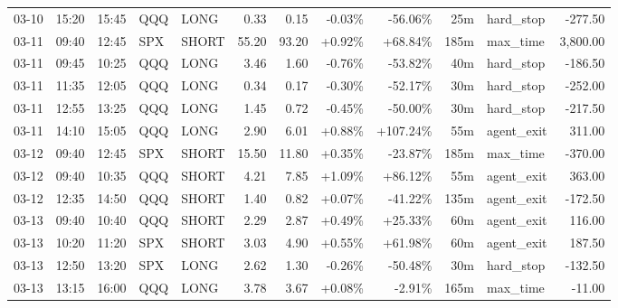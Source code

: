 \documentclass[11pt,a4paper,twoside]{article}
\begin{document}
\begin{center}
\begin{longtable}{>{\color{txtmain}}l l l l l r r r r r >{\color{txtmain}}l r}
03-10 & 15:20 & 15:45 & QQQ & LONG & 0.33 & 0.15 & \textcolor{lossred}{-0.03\%} & \textcolor{lossred}{-56.06\%} & 25m & hard\_stop & \textcolor{lossred}{-277.50} \\
03-11 & 09:40 & 12:45 & SPX & SHORT & 55.20 & 93.20 & \textcolor{wingreen}{+0.92\%} & \textcolor{wingreen}{+68.84\%} & 185m & max\_time & \textcolor{wingreen}{3,800.00} \\
03-11 & 09:45 & 10:25 & QQQ & LONG & 3.46 & 1.60 & \textcolor{lossred}{-0.76\%} & \textcolor{lossred}{-53.82\%} & 40m & hard\_stop & \textcolor{lossred}{-186.50} \\
03-11 & 11:35 & 12:05 & QQQ & LONG & 0.34 & 0.17 & \textcolor{lossred}{-0.30\%} & \textcolor{lossred}{-52.17\%} & 30m & hard\_stop & \textcolor{lossred}{-252.00} \\
03-11 & 12:55 & 13:25 & QQQ & LONG & 1.45 & 0.72 & \textcolor{lossred}{-0.45\%} & \textcolor{lossred}{-50.00\%} & 30m & hard\_stop & \textcolor{lossred}{-217.50} \\
03-11 & 14:10 & 15:05 & QQQ & LONG & 2.90 & 6.01 & \textcolor{wingreen}{+0.88\%} & \textcolor{wingreen}{+107.24\%} & 55m & agent\_exit & \textcolor{wingreen}{311.00} \\
03-12 & 09:40 & 12:45 & SPX & SHORT & 15.50 & 11.80 & \textcolor{wingreen}{+0.35\%} & \textcolor{lossred}{-23.87\%} & 185m & max\_time & \textcolor{lossred}{-370.00} \\
03-12 & 09:40 & 10:35 & QQQ & SHORT & 4.21 & 7.85 & \textcolor{wingreen}{+1.09\%} & \textcolor{wingreen}{+86.12\%} & 55m & agent\_exit & \textcolor{wingreen}{363.00} \\
03-12 & 12:35 & 14:50 & QQQ & SHORT & 1.40 & 0.82 & \textcolor{wingreen}{+0.07\%} & \textcolor{lossred}{-41.22\%} & 135m & agent\_exit & \textcolor{lossred}{-172.50} \\
03-13 & 09:40 & 10:40 & QQQ & SHORT & 2.29 & 2.87 & \textcolor{wingreen}{+0.49\%} & \textcolor{wingreen}{+25.33\%} & 60m & agent\_exit & \textcolor{wingreen}{116.00} \\
03-13 & 10:20 & 11:20 & SPX & SHORT & 3.03 & 4.90 & \textcolor{wingreen}{+0.55\%} & \textcolor{wingreen}{+61.98\%} & 60m & agent\_exit & \textcolor{wingreen}{187.50} \\
03-13 & 12:50 & 13:20 & SPX & LONG & 2.62 & 1.30 & \textcolor{lossred}{-0.26\%} & \textcolor{lossred}{-50.48\%} & 30m & hard\_stop & \textcolor{lossred}{-132.50} \\
03-13 & 13:15 & 16:00 & QQQ & LONG & 3.78 & 3.67 & \textcolor{wingreen}{+0.08\%} & \textcolor{lossred}{-2.91\%} & 165m & max\_time & \textcolor{lossred}{-11.00} \\

\end{longtable}
\end{center}
\end{document}
